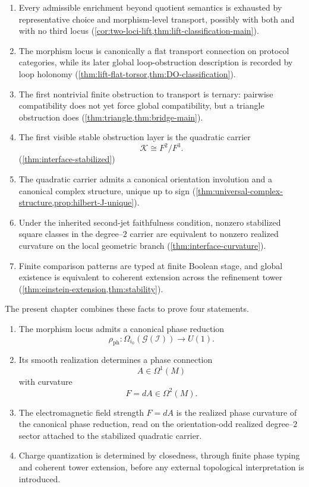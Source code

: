 \begin{enumerate}
	\item
	      Every admissible enrichment beyond quotient semantics is
	      exhausted by representative choice and morphism-level transport,
	      possibly with both and with no third locus
	      (\cref{cor:two-loci-lift,thm:lift-classification-main}).
	\item
	      The morphism locus is canonically a flat transport connection on
	      protocol categories, while its later global loop-obstruction
	      description is recorded by loop holonomy
	      (\cref{thm:lift-flat-torsor,thm:DO-classification}).
	\item
	      The first nontrivial finite obstruction to transport is ternary:
	      pairwise compatibility does not yet force global compatibility, but a
	      triangle obstruction does (\cref{thm:triangle,thm:bridge-main}).
	\item
	      The first visible stable obstruction layer is the quadratic carrier
	      \[
		      \mathcal K \cong F^2/F^3.
	      \]
	      (\cref{thm:interface-stabilized})
	\item
	      The quadratic carrier admits a canonical orientation involution and a
	      canonical complex structure, unique up to sign
	      (\cref{thm:universal-complex-structure,prop:hilbert-J-unique}).
	\item
	      Under the inherited second-jet faithfulness condition, nonzero
	      stabilized square classes in the degree--\(2\) carrier are
	      equivalent to nonzero realized curvature on the local geometric
	      branch (\cref{thm:interface-curvature}).
	\item
	      Finite comparison patterns are typed at finite Boolean stage, and
	      global existence is equivalent to coherent extension across the
	      refinement tower (\cref{thm:einstein-extension,thm:stability}).
\end{enumerate}
The present chapter combines these facts to prove four statements.
\begin{enumerate}
	\item
	      The morphism locus admits a canonical phase reduction
	      \[
		      \rho_{\mathrm{ph}}:\Omega_{i_0}(\mathcal G(\mathcal I))\to U(1).
	      \]
	\item
	      Its smooth realization determines a phase connection
	      \[
		      A\in\Omega^1(M)
	      \]
	      with curvature
	      \[
		      F=dA\in\Omega^2(M).
	      \]
	\item
	      The electromagnetic field strength \(F=dA\) is the realized
	      phase curvature of the canonical phase reduction, read on the
	      orientation-odd realized degree--\(2\) sector attached to the
	      stabilized quadratic carrier.
	\item
	      Charge quantization is determined by closedness, through finite phase
	      typing and coherent tower extension, before any external topological
	      interpretation is introduced.
\end{enumerate}
